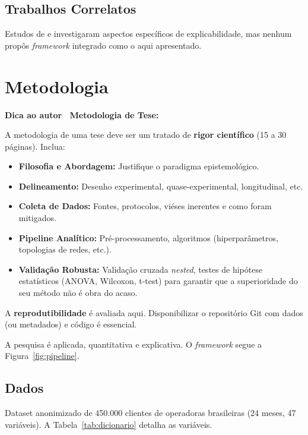 \documentclass[
    12pt,
    oneside,
    a4paper,
    english,
    brazilian
    ]{abntex2}
\numberwithin{equation}{chapter}
\newenvironment{dica}{%
    \par\medskip
    \color{blue!60!black}\small\itshape
}{%
    \par\medskip
}
\begin{document}
\section{Trabalhos Correlatos}

Estudos de  e  investigaram aspectos específicos de explicabilidade, mas nenhum propôs \textit{framework} integrado como o aqui apresentado.

\chapter{Metodologia}

\begin{dica}
\noindent\textbf{Dica ao autor \textemdash\ Metodologia de Tese:}

A metodologia de uma tese deve ser um tratado de \textbf{rigor científico} (15 a 30 páginas). Inclua:
\begin{itemize}
    \item \textbf{Filosofia e Abordagem:} Justifique o paradigma epistemológico.
    \item \textbf{Delineamento:} Desenho experimental, quase-experimental, longitudinal, etc.
    \item \textbf{Coleta de Dados:} Fontes, protocolos, viéses inerentes e como foram mitigados.
    \item \textbf{Pipeline Analítico:} Pré-processamento, algoritmos (hiperparâmetros, topologias de redes, etc.).
    \item \textbf{Validação Robusta:} Validação cruzada \textit{nested}, testes de hipótese estatísticos (ANOVA, Wilcoxon, t-test) para garantir que a superioridade do seu método não é obra do acaso.
\end{itemize}
A \textbf{reprodutibilidade} \cite{moresi2023} é avaliada aqui. Disponibilizar o repositório Git com dados (ou metadados) e código é essencial.
\end{dica}

A pesquisa é aplicada, quantitativa e explicativa. O \textit{framework} segue a Figura~\ref{fig:pipeline}.

\section{Dados}

Dataset anonimizado de 450.000 clientes de operadoras brasileiras (24 meses, 47 variáveis). A Tabela~\ref{tab:dicionario} detalha as variáveis.
\end{document}

